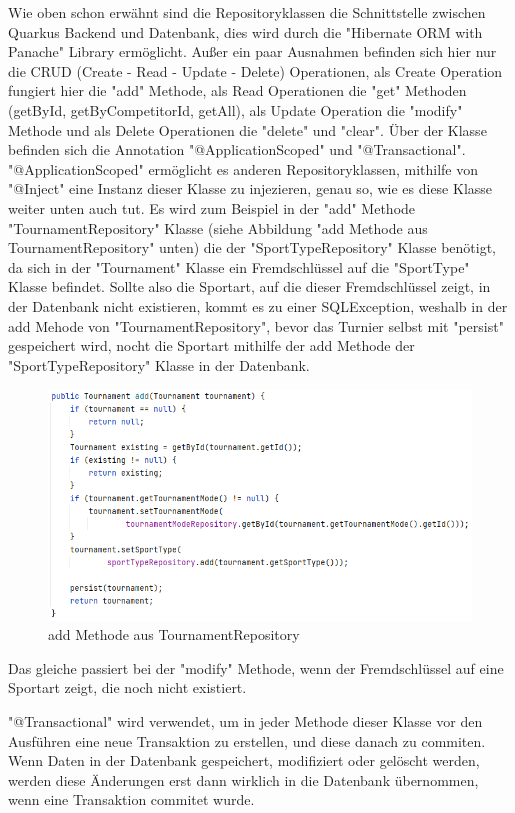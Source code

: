 Wie oben schon erwähnt sind die Repositoryklassen die Schnittstelle zwischen Quarkus Backend und Datenbank, dies wird durch die "Hibernate ORM with Panache" Library ermöglicht. 
Außer ein paar Ausnahmen befinden sich hier nur die CRUD (Create - Read - Update - Delete) Operationen, als Create Operation fungiert hier die "add" Methode, 
als Read Operationen die "get" Methoden (getById, getByCompetitorId, getAll), als Update Operation die "modify" Methode und als Delete Operationen die "delete" und "clear". 
Über der Klasse befinden sich die Annotation "@ApplicationScoped" und "@Transactional". "@ApplicationScoped" ermöglicht es anderen Repositoryklassen, mithilfe von "@Inject" eine Instanz dieser Klasse zu injezieren, genau so, 
wie es diese Klasse weiter unten auch tut. Es wird zum Beispiel in der "add" Methode "TournamentRepository" Klasse (siehe Abbildung "add Methode aus TournamentRepository" unten) die 
der "SportTypeRepository" Klasse benötigt, da sich in der "Tournament" Klasse ein Fremdschlüssel auf die "SportType" Klasse befindet. Sollte also die Sportart, 
auf die dieser Fremdschlüssel zeigt, in der Datenbank nicht existieren, kommt es zu einer SQLException, weshalb in der add Mehode von "TournamentRepository", 
bevor das Turnier selbst mit "persist" gespeichert wird, nocht die Sportart mithilfe der add Methode der "SportTypeRepository" Klasse in der Datenbank. 

\begin{figure}[H]
    \includegraphics[scale=0.8]{pics/backend/repository_add_function.png}
    \caption{add Methode aus TournamentRepository}
\end{figure}

Das gleiche passiert bei der "modify" Methode, wenn der Fremdschlüssel auf eine Sportart zeigt, die noch nicht existiert.

"@Transactional" wird verwendet, um in jeder Methode dieser Klasse vor den Ausführen eine neue Transaktion zu erstellen, und diese danach zu commiten. 
Wenn Daten in der Datenbank gespeichert, modifiziert oder gelöscht werden, werden diese Änderungen erst dann wirklich in die Datenbank übernommen, wenn eine Transaktion commitet wurde.

